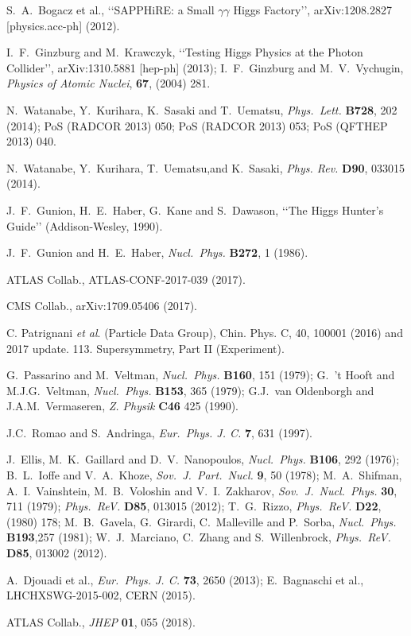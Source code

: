 \documentclass[final,5p,times,twocolumn]{elsarticle}
\begin{document}
\begin{thebibliography}{99}
S.~A.~Bogacz et al.,
\lq\lq SAPPHiRE: a Small $\gamma\gamma$ Higgs Factory\rq\rq,
arXiv:1208.2827 [physics.acc-ph] (2012). 

I.~F.~Ginzburg and M.~Krawczyk,
\lq\lq Testing Higgs Physics at the Photon Collider\rq\rq,
arXiv:1310.5881 [hep-ph] (2013); 
I.~F.~Ginzburg and M.~V.~Vychugin, {\sl Physics of Atomic Nuclei}, {\bf 67}, (2004) 281.
  
N.~Watanabe, Y.~Kurihara, K.~Sasaki and T.~Uematsu, {\sl Phys.\ Lett.}  {\bf B728}, 202 (2014); 
  PoS (RADCOR 2013) 050; PoS (RADCOR 2013) 053;
PoS (QFTHEP 2013) 040.

N.~Watanabe, Y.~Kurihara, T.~Uematsu,and K.~Sasaki, {\sl Phys. Rev.} {\bf D90}, 033015 (2014).

J.~F.~Gunion, H.~E.~Haber, G.~Kane and S.~Dawason,
\lq\lq The Higgs Hunter's Guide\rq\rq 
(Addison-Wesley, 1990).

J.~F.~Gunion and H.~E.~Haber,  {\sl Nucl.~Phys.}  {\bf B272}, 1  (1986).

ATLAS Collab., ATLAS-CONF-2017-039 (2017).

CMS Collab., arXiv:1709.05406 (2017).

C. Patrignani {\it et al}. (Particle Data Group), Chin. Phys. C, 40, 100001 (2016) and 2017 update. 
113. Supersymmetry, Part II (Experiment).

G.~Passarino and M.~Veltman, {\sl Nucl.~Phys.}  {\bf B160}, 151  (1979);  
G.~'t Hooft and M.J.G.~Veltman, {\sl Nucl.~Phys.} {\bf B153}, 365 (1979); 
G.J.~van Oldenborgh and J.A.M.~Vermaseren, {\sl Z. Physik}  {\bf C46} 425 (1990).

J.C.~Romao and S.~Andringa, {\sl Eur.~Phys. J. C.} {\bf 7}, 631 (1997).

J.~Ellis, M.~K.~Gaillard and D.~V.~Nanopoulos, {\sl Nucl.\ Phys.}  {\bf B106}, 292 (1976); 
B.~L.~Ioffe and V.~A.~Khoze, {\sl Sov.\ J.\ Part.\ Nucl.} {\bf 9}, 50 (1978); 
M.~A.~Shifman, A.~I.~Vainshtein, M.~B.~Voloshin and V.~I.~Zakharov, {\sl Sov.\ J.\ Nucl.\ Phys.} 
 {\bf 30}, 711 (1979); {\sl Phys.\  ReV.} {\bf D85}, 013015 (2012); 
T.~G.~Rizzo, {\sl Phys.\  ReV.} {\bf D22}, (1980) 178; 
M.~B.~Gavela, G.~Girardi, C.~Malleville and P.~Sorba, {\sl Nucl.\ Phys.}  {\bf B193},257 (1981); 
W.~J.~Marciano, C.~Zhang and S.~Willenbrock, {\sl Phys.\  ReV.} {\bf D85}, 013002 (2012).

A.~Djouadi et al., {\sl Eur.~Phys. J. C.} {\bf 73}, 2650 (2013); 
E.~Bagnaschi et al., LHCHXSWG-2015-002, CERN (2015).

ATLAS Collab., {\sl JHEP}  {\bf 01}, 055  (2018).


\end{thebibliography}
\end{document}
